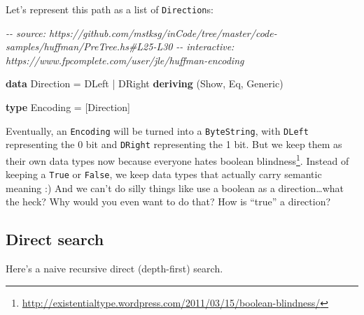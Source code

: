 \documentclass[]{article}
\newenvironment{Shaded}{}{}
\newcommand{\CommentTok}[1]{\textcolor[rgb]{0.38,0.63,0.69}{\textit{#1}}}
\newcommand{\DataTypeTok}[1]{\textcolor[rgb]{0.56,0.13,0.00}{#1}}
\newcommand{\KeywordTok}[1]{\textcolor[rgb]{0.00,0.44,0.13}{\textbf{#1}}}
\newcommand{\NormalTok}[1]{#1}
\newcommand{\OperatorTok}[1]{\textcolor[rgb]{0.40,0.40,0.40}{#1}}
\newcommand{\OtherTok}[1]{\textcolor[rgb]{0.00,0.44,0.13}{#1}}
\renewcommand{\href}[2]{#2\footnote{\url{#1}}}
\begin{document}
Let's represent this path as a list of \texttt{Direction}s:

\begin{Shaded}
\begin{Highlighting}[]
\CommentTok{{-}{-} source: https://github.com/mstksg/inCode/tree/master/code{-}samples/huffman/PreTree.hs\#L25{-}L30}
\CommentTok{{-}{-} interactive: https://www.fpcomplete.com/user/jle/huffman{-}encoding}

\KeywordTok{data} \DataTypeTok{Direction} \OtherTok{=} \DataTypeTok{DLeft}
               \OperatorTok{|} \DataTypeTok{DRight}
               \KeywordTok{deriving}\NormalTok{ (}\DataTypeTok{Show}\NormalTok{, }\DataTypeTok{Eq}\NormalTok{, }\DataTypeTok{Generic}\NormalTok{)}

\KeywordTok{type} \DataTypeTok{Encoding} \OtherTok{=}\NormalTok{ [}\DataTypeTok{Direction}\NormalTok{]}
\end{Highlighting}
\end{Shaded}

Eventually, an \texttt{Encoding} will be turned into a \texttt{ByteString}, with
\texttt{DLeft} representing the 0 bit and \texttt{DRight} representing the 1
bit. But we keep them as their own data types now because everyone hates
\href{http://existentialtype.wordpress.com/2011/03/15/boolean-blindness/}{boolean
blindness}. Instead of keeping a \texttt{True} or \texttt{False}, we keep data
types that actually carry semantic meaning :) And we can't do silly things like
use a boolean as a direction\ldots what the heck? Why would you even want to do
that? How is ``true'' a direction?

\hypertarget{direct-search}{%
\subsection{Direct search}\label{direct-search}}

Here's a naive recursive direct (depth-first) search.
\end{document}
